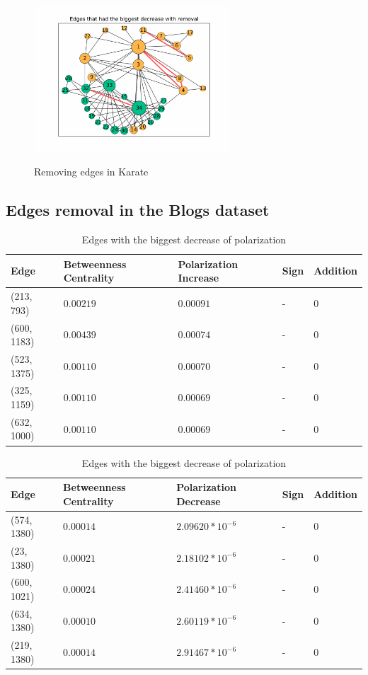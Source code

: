 \begin{figure}[H]
	\centering
	\includegraphics[width=0.65\textwidth]{Figures/karate_decrease}
	\label{fig:karate_decrease}
	\caption{Removing edges in Karate}
\end{figure}


\subsection{Edges removal in the Blogs dataset}

\begin{table}[H]
 \centering
 \caption{Edges with the biggest increase of polarization}
 \label{tab:edgesLargest}
 \begin{tabular}{| l || l | l | l | l |}
 \hline
  Edge & Betweenness Centrality & Polarization Increase & Sign & Addition\\
  \hline
  \hline
  (213, 793) & $0.00219$ & $0.00091$ & - &  0\\
  \hline
  (600, 1183) & $0.00439$ & $0.00074$ & - &  0\\
  \hline
  (523, 1375) & $0.00110$ & $0.00070$ & - &  0\\
  \hline
  (325, 1159) & $0.00110$ & $0.00069$ & - &  0\\
  \hline
  (632, 1000) & $0.00110$ & $0.00069$ & - &  0\\
  \hline
 \end{tabular}
 
 
 \caption{Edges with the biggest decrease of polarization }
 \label{tab:edgesLargest}
 \begin{tabular}{| l || l | l | l | l |}
 \hline
  Edge & Betweenness Centrality & Polarization Decrease & Sign & Addition\\
  \hline
  \hline
  (574, 1380) & $0.00014$ & $2.09620*10^{-6}$ & - &  0\\
  \hline
  (23, 1380) & $0.00021$ & $2.18102*10^{-6}$ & - &  0\\
  \hline
  (600, 1021) & $0.00024$ & $2.41460*10^{-6}$ & - &  0\\
  \hline
  (634, 1380) & $0.00010$ & $2.60119*10^{-6}$ & - &  0\\
  \hline
  (219, 1380) & $0.00014$ & $2.91467*10^{-6}$ & - &  0\\
  \hline
  \hline
 \end{tabular}
 
\end{table}

